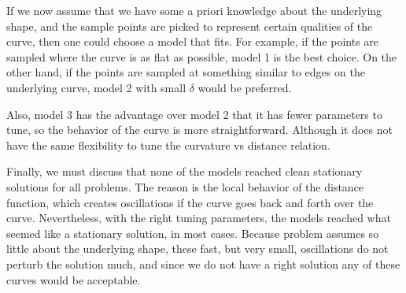 If we now assume that we have some a priori knowledge about the underlying shape, and the sample points are picked to represent certain qualities of the curve, then one could choose a model that fits. For example, if the points are sampled where the curve is as flat as possible, model 1 is the best choice. On the other hand, if the points are sampled at something similar to edges on the underlying curve, model 2 with small $\delta$ would be preferred.

Also, model 3 has the advantage over model 2 that it has fewer parameters to tune, so the behavior of the curve is more straightforward. Although it does not have the same flexibility to tune the curvature vs distance relation.

Finally, we must discuss that none of the models reached clean stationary solutions for all problems. The reason is the local behavior of the distance function, which creates oscillations if the curve goes back and forth over the curve. Nevertheless, with the right tuning parameters, the models reached what seemed like a stationary solution, in most cases. Because problem assumes so little about the underlying shape, these fast, but very small, oscillations do not perturb the solution much, and since we do not have a right solution any of these curves would be acceptable.
